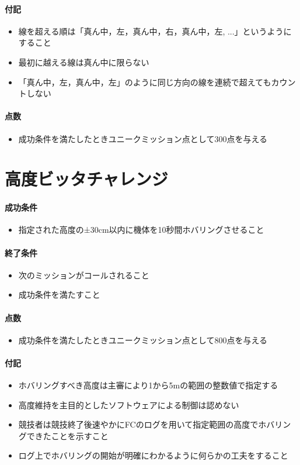 \documentclass[a4paper,12pt,oneside]{jsarticle}
\begin{document}
\paragraph{付記}
\begin{itemize}
  \item 線を超える順は「真ん中，左，真ん中，右，真ん中，左, ...」というようにすること
  \item 最初に越える線は真ん中に限らない
  \item 「真ん中，左，真ん中，左」のように同じ方向の線を連続で超えてもカウントしない
\end{itemize}

\paragraph{点数}
\begin{itemize}
  \item 成功条件を満たしたときユニークミッション点として300点を与える
\end{itemize}

\newpage
\section{高度ビッタチャレンジ}
\paragraph{成功条件}
\begin{itemize}
  \item 指定された高度の±30cm以内に機体を10秒間ホバリングさせること
\end{itemize}
\paragraph{終了条件}
\begin{itemize}
  \item 次のミッションがコールされること
  \item 成功条件を満たすこと
\end{itemize}
\paragraph{点数}
\begin{itemize}
  \item 成功条件を満たしたときユニークミッション点として800点を与える
\end{itemize}
\paragraph{付記}
\begin{itemize}
  \item ホバリングすべき高度は主審により1から5mの範囲の整数値で指定する
  \item 高度維持を主目的としたソフトウェアによる制御は認めない
  \item 競技者は競技終了後速やかにFCのログを用いて指定範囲の高度でホバリングできたことを示すこと
  \item ログ上でホバリングの開始が明確にわかるように何らかの工夫をすること
\end{itemize}
\end{document}
